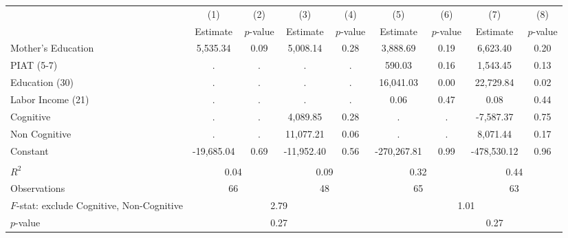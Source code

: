 \begin{tabular}{lcccccccc} \toprule
 & (1) & (2) & (3) & (4) & (5) & (6) & (7) & (8) \\
 & Estimate & $p$-value & Estimate & $p$-value  & Estimate & $p$-value  & Estimate & $p$-value  \\ \midrule 
Mother's Education &     5,535.34 &         0.09 &     5,008.14 &         0.28 &     3,888.69 &         0.19 &     6,623.40 &         0.20 \\  
PIAT (5-7) &            . &            . &            . &            . &       590.03 &         0.16 &     1,543.45 &         0.13 \\  
Education (30) &            . &            . &            . &            . &    16,041.03 &         0.00 &    22,729.84 &         0.02 \\  
Labor Income (21) &            . &            . &            . &            . &         0.06 &         0.47 &         0.08 &         0.44 \\  
Cognitive &            . &            . &     4,089.85 &         0.28 &            . &            . &    -7,587.37 &         0.75 \\  
Non Cognitive &            . &            . &    11,077.21 &         0.06 &            . &            . &     8,071.44 &         0.17 \\  
Constant &   -19,685.04 &         0.69 &   -11,952.40 &         0.56 &  -270,267.81 &         0.99 &  -478,530.12 &         0.96 \\  \\ \midrule
$R^2$ &         \multicolumn{2}{c}{0.04} &            \multicolumn{2}{c}{0.09} &              \multicolumn{2}{c}{0.32} &                  \multicolumn{2}{c}{0.44}       \\  
Observations &         \multicolumn{2}{c}{66 }&                  \multicolumn{2}{c}{48} &                    \multicolumn{2}{c}{65} &              \multicolumn{2}{c}{63} \\  
$F$-stat: exclude Cognitive, Non-Cognitive &             \multicolumn{4}{c}{2.79} &                           \multicolumn{4}{c}{1.01}  \\  
$p$-value  &            \multicolumn{4}{c}{0.27} &            &              \multicolumn{4}{c}{0.27}  \\  \bottomrule \end{tabular}
